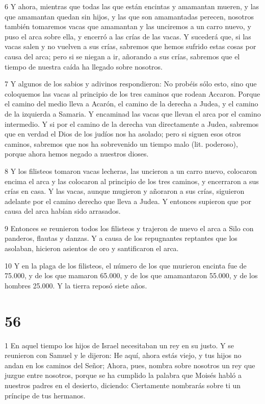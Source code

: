 \par 6 Y ahora, mientras que todas las que están encintas y amamantan mueren, y las que amamantan quedan sin hijos, y las que son amamantadas perecen, nosotros también tomaremos vacas que amamantan y las unciremos a un carro nuevo, y puso el arca sobre ella, y encerró a las crías de las vacas. Y sucederá que, si las vacas salen y no vuelven a sus crías, sabremos que hemos sufrido estas cosas por causa del arca; pero si se niegan a ir, añorando a sus crías, sabremos que el tiempo de nuestra caída ha llegado sobre nosotros.

\par 7 Y algunos de los sabios y adivinos respondieron: No probéis sólo esto, sino que coloquemos las vacas al principio de los tres caminos que rodean Accaron. Porque el camino del medio lleva a Acarón, el camino de la derecha a Judea, y el camino de la izquierda a Samaria. Y encaminad las vacas que llevan el arca por el camino intermedio. Y si por el camino de la derecha van directamente a Judea, sabremos que en verdad el Dios de los judíos nos ha asolado; pero si siguen esos otros caminos, sabremos que nos ha sobrevenido un tiempo malo (lit. poderoso), porque ahora hemos negado a nuestros dioses.

\par 8 Y los filisteos tomaron vacas lecheras, las uncieron a un carro nuevo, colocaron encima el arca y las colocaron al principio de los tres caminos, y encerraron a sus crías en casa. Y las vacas, aunque mugieron y añoraron a sus crías, siguieron adelante por el camino derecho que lleva a Judea. Y entonces supieron que por causa del arca habían sido arrasados.

\par 9 Entonces se reunieron todos los filisteos y trajeron de nuevo el arca a Silo con panderos, flautas y danzas. Y a causa de los repugnantes reptantes que los asolaban, hicieron asientos de oro y santificaron el arca.

\par 10 Y en la plaga de los filisteos, el número de los que murieron encinta fue de 75.000, y de los que mamaron 65.000, y de los que amamantaron 55.000, y de los hombres 25.000. Y la tierra reposó siete años.

\chapter{56}

\par 1 En aquel tiempo los hijos de Israel necesitaban un rey en su justo. Y se reunieron con Samuel y le dijeron: He aquí, ahora estás viejo, y tus hijos no andan en los caminos del Señor; Ahora, pues, nombra sobre nosotros un rey que juzgue entre nosotros, porque se ha cumplido la palabra que Moisés habló a nuestros padres en el desierto, diciendo: Ciertamente nombrarás sobre ti un príncipe de tus hermanos.


